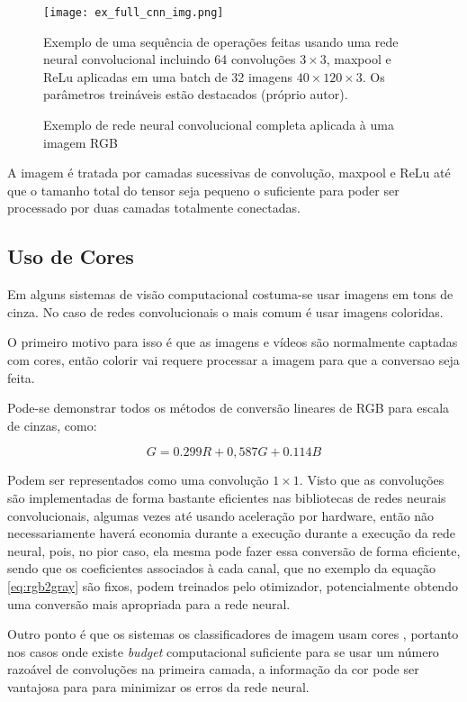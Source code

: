 \begin{figure}[!htb]
	\centering
	\texttt{[image: ex\_full\_cnn\_img.png]}
	\caption{Exemplo de rede neural convolucional completa aplicada à uma imagem
	RGB}
	\label{fig:ex_full_cnn_img}
	Exemplo de uma sequência de operações feitas usando uma rede neural
	convolucional incluindo 64 convoluções $3 \times 3$, maxpool e ReLu
	aplicadas em uma
	batch de 32 imagens $40 \times 120 \times 3$. Os parâmetros treináveis
	estão destacados (próprio autor).
\end{figure}

A imagem é tratada por camadas sucessivas de convolução, maxpool e ReLu até que
o tamanho total do tensor seja pequeno o suficiente para poder ser processado
por duas camadas totalmente conectadas. 

\subsection{Uso de Cores}
Em alguns sistemas de visão computacional costuma-se usar imagens em
tons de cinza. No caso de redes convolucionais o mais comum é usar
imagens coloridas.

O primeiro motivo para isso é que as imagens e vídeos são normalmente
captadas com cores, então colorir vai requere processar a imagem para
que a conversao seja feita. 

Pode-se demonstrar todos os métodos de conversão lineares de RGB para escala de
cinzas, como:

\begin{equation} \label{eq:rgb2gray}
	G=0.299R + 0,587G + 0.114B
\end{equation}

Podem ser representados como uma convolução $1 \times 1$. Visto que as
convoluções são implementadas de forma bastante eficientes nas bibliotecas
de redes neurais convolucionais, algumas vezes até usando aceleração por
hardware, então não necessariamente haverá economia durante a execução
durante a execução da rede neural, pois, no pior caso, ela mesma pode fazer
essa conversão de forma eficiente, sendo que os coeficientes associados
à cada canal, que no exemplo da equação \ref{eq:rgb2gray} são fixos, podem
treinados pelo otimizador, potencialmente obtendo uma conversão mais apropriada
para a rede neural.

Outro ponto é que os sistemas os classificadores de imagem usam cores
\cite{szegedy2015going} \cite{hasanpour2016lets}, portanto nos casos onde
existe \emph{budget} computacional suficiente para se usar um número razoável
de convoluções na primeira camada, a informação da cor pode ser vantajosa
para para minimizar os erros da rede neural.


